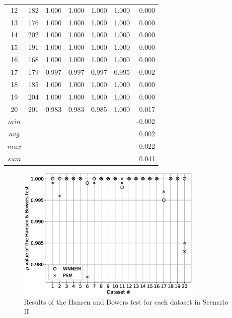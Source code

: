 \begin{table}[h]
\begin{tabular}{ccccccr}
				12      & 182     & 1.000     & 1.000     & 1.000     & 1.000 & 0.000      \\
				13      & 176     & 1.000     & 1.000     & 1.000     & 1.000 & 0.000      \\
				14      & 202     & 1.000     & 1.000     & 1.000     & 1.000 & 0.000      \\
				15      & 191     & 1.000     & 1.000     & 1.000     & 1.000 & 0.000      \\
				16      & 168     & 1.000     & 1.000     & 1.000     & 1.000 & 0.000      \\
				17      & 179     & 0.997     & 0.997     & 0.997     & 0.995 & -0.002     \\
				18      & 185     & 1.000     & 1.000     & 1.000     & 1.000 & 0.000      \\
				19      & 204     & 1.000     & 1.000     & 1.000     & 1.000 & 0.000      \\
				20      & 201     & 0.983     & 0.983     & 0.985     & 1.000 & 0.017      \\
				\midrule
				$min$   &         &           &           &           &       & -0.002     \\
				$avg$   &         &           &           &           &       & 0.002      \\
				$max$   &         &           &           &           &       & 0.022      \\
				$sum$   &         &           &           &           &       & 0.041      \\
				\bottomrule
			\end{tabular}
		\end{table}
										
										
		\begin{figure}[h]
			\centering
			\captionsetup{justification=centering}
			\includegraphics[width=0.8\textwidth]{assets/figures/control_group_selection/wnnem/scenII/hbp.eps}
			\caption{Results of the Hansen and Bowers test for each dataset in Scenario II.}
			\label{fig:wnnem_scen_II_hbp}    
		\end{figure}
										

